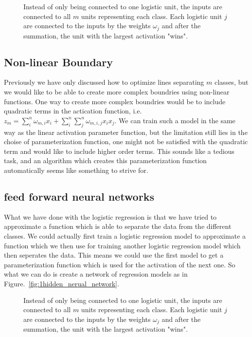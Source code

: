 \begin{figure}
\centering

\caption{\label{fig:multiple_logistic_units}Instead of only being connected to one logistic unit, the inputs are connected to all $m$ units representing each class. Each logistic unit $j$ are connected to the inputs by the weights $\omega_j$ and after the summation, the unit with the largest activation "wins".}
\end{figure}

\subsection{Non-linear Boundary}

Previously we have only discussed how to optimize lines separating $m$ classes, but we would like to be able to create more complex boundries using non-linear functions. One way to create more complex boundries would be to include quadratic terms in the actication function, i.e. $z_m=\sum_i^n\omega_{m,i}x_i + \sum_i^n\sum_j^n\omega_{m,i,j}x_i x_j$. We can train such a model in the same way as the linear activation parameter function, but the limitation still lies in the choise of parameterization function, one might not be satisfied with the quadratic term and would like to include higher order terms. This sounds like a tedious task, and an algorithm which creates this parameterization function automatically seems like something to strive for.

\subsection{feed forward neural networks}

What we have done with the logistic regression is that we have tried to approximate a function which is able to separate the data from the different classes. We could actually first train a logistic regression model to approximate a function which we then use for training another logistic regression model which then seperates the data. This means we could use the first model to get a parameterization function which is used for the activation of the next one. So what we can do is create a network of regression models as in Figure.~\ref{fig:1hidden_nerual_network}.

\begin{figure}
\centering

\caption{\label{fig:1hidden_neural_network}Instead of only being connected to one logistic unit, the inputs are connected to all $m$ units representing each class. Each logistic unit $j$ are connected to the inputs by the weights $\omega_j$ and after the summation, the unit with the largest activation "wins".}
\end{figure}

